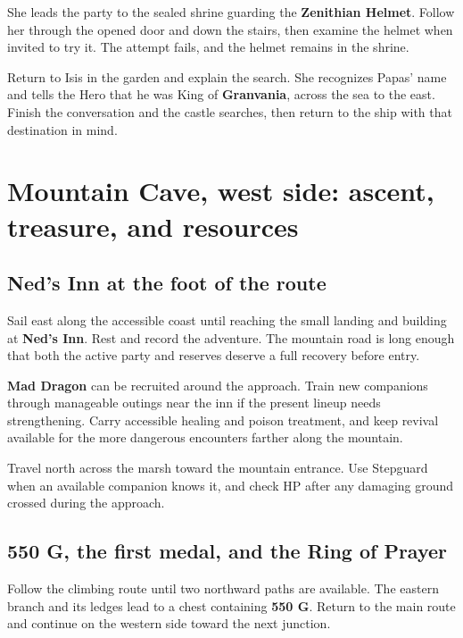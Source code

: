 She leads the party to the sealed shrine guarding the
\textbf{Zenithian Helmet}. Follow her through the opened door and
down the stairs, then examine the helmet when invited to try it.
The attempt fails, and the helmet remains in the shrine.


Return to Isis in the garden and explain the search. She recognizes
Papas' name and tells the Hero that he was King of \textbf{Granvania},
across the sea to the east. Finish the conversation and the castle
searches, then return to the ship with that destination in mind.

\section{Mountain Cave, west side: ascent, treasure, and resources}

\subsection*{Ned's Inn at the foot of the route}

Sail east along the accessible coast until reaching the small landing
and building at \textbf{Ned's Inn}. Rest and record the adventure.
The mountain road is long enough that both the active party and reserves
deserve a full recovery before entry.

\textbf{Mad Dragon} can be recruited around the approach. Train new
companions through manageable outings near the inn if the present
lineup needs strengthening. Carry accessible healing and poison
treatment, and keep revival available for the more dangerous encounters
farther along the mountain.

Travel north across the marsh toward the mountain entrance. Use
Stepguard when an available companion knows it, and check HP after
any damaging ground crossed during the approach.

\subsection*{550 G, the first medal, and the Ring of Prayer}

Follow the climbing route until two northward paths are available.
The eastern branch and its ledges lead to a chest containing
\textbf{550 G}. Return to the main route and continue on the western
side toward the next junction.

